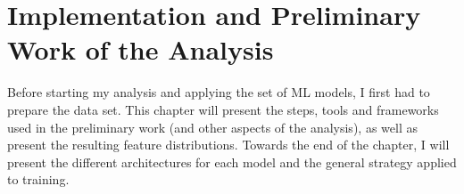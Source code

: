\chapter{Implementation and Preliminary Work of the Analysis}\label{chap:Implementation}
Before starting my analysis and applying the set of \ac{ML} models, I first had to prepare the data set. This chapter 
will present the steps, tools and frameworks used in the preliminary work (and other aspects of the analysis), as well as present the 
resulting feature distributions. Towards the end of the chapter, I will present the different architectures for each model and the general 
strategy applied to training.

